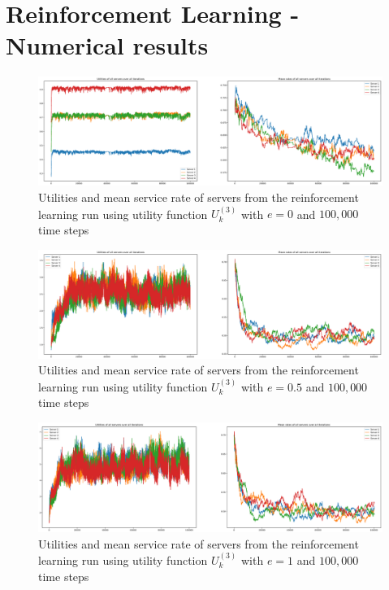 \chapter{Reinforcement Learning - Numerical results}
\label{appendix:reinforcement_learning}

\begin{figure}[H]
    \includegraphics[width=\textwidth]{chapters/00_appendix/03_more_rl_results/Bin/utility_3_eps/u3_1_e0.eps}
    \caption{Utilities and mean service rate of servers from the reinforcement
    learning run using utility function \(U_k^{(3)}\) with \(e = 0\) and
    \(100,\!000\) time steps}
    \label{fig:RL_utility3_1_e0}
\end{figure}

\begin{figure}[H]
    \includegraphics[width=\textwidth]{chapters/00_appendix/03_more_rl_results/Bin/utility_3_eps/u3_1_e05.eps}
    \caption{Utilities and mean service rate of servers from the reinforcement
    learning run using utility function \(U_k^{(3)}\) with \(e = 0.5\) and
    \(100,\!000\) time steps}
    \label{fig:RL_utility3_1_e05}
\end{figure}

\begin{figure}[H]
    \includegraphics[width=\textwidth]{chapters/00_appendix/03_more_rl_results/Bin/utility_3_eps/u3_1_e1.eps}
    \caption{Utilities and mean service rate of servers from the reinforcement
    learning run using utility function \(U_k^{(3)}\) with \(e = 1\) and
    \(100,\!000\) time steps}
    \label{fig:RL_utility3_1_e1}
\end{figure}


